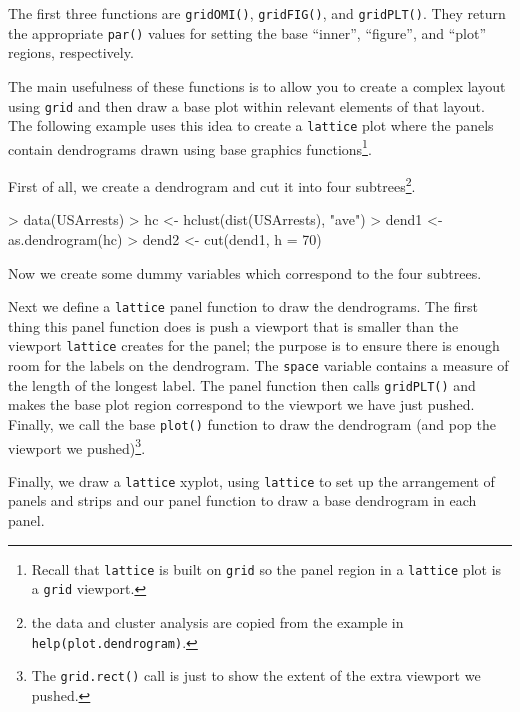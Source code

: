 \documentclass[a4paper]{article}
\newcommand{\grid}{{\tt grid}}
\newcommand{\lattice}{{\tt lattice}}
\begin{document}
The first three functions are \verb|gridOMI()|, \verb|gridFIG()|,
and \verb|gridPLT()|.  They return the appropriate
\verb|par()| values for setting the base ``inner'', ``figure'',
and ``plot'' regions, respectively.

The main usefulness of these functions is to allow you to create a
complex layout using \grid{} and then draw a base plot within 
relevant elements of that layout.  The following example
uses this idea to create a \lattice{} plot where the panels contain 
dendrograms drawn using base graphics functions\footnote{Recall
that \lattice{} is built on \grid{} so the panel region in
a \lattice{} plot is a \grid{} viewport.}.

First of all, we create a dendrogram and cut it into four 
subtrees\footnote{the data and cluster analysis are copied from the example
in {\tt help(plot.dendrogram)}.}.

\begin{Schunk}
\begin{Sinput}
> data(USArrests)
> hc <- hclust(dist(USArrests), "ave")
> dend1 <- as.dendrogram(hc)
> dend2 <- cut(dend1, h = 70)
\end{Sinput}
\end{Schunk}
Now we create some dummy variables which correspond to the four subtrees.

\begin{Schunk}
\end{Schunk}
Next we define a \lattice{} panel function to draw the dendrograms.
The first thing this panel function does is push a viewport
that is smaller than the viewport \lattice{} creates for the panel;
the purpose is to ensure there is enough room for the labels on
the dendrogram.  The \verb|space| variable contains a measure
of the length of the longest label.
The panel function then calls \verb|gridPLT()|
and makes the base plot region correspond to the 
viewport we have just pushed.  Finally, we
call the base \verb|plot()| function to draw the 
dendrogram (and pop the viewport we pushed)\footnote{The {\tt grid.rect()}
call is just to show the extent of the extra viewport we pushed.}.

\begin{Schunk}
\end{Schunk}
Finally, we draw a \lattice{} xyplot, using \lattice{} to set up the
arrangement of panels and strips and our panel function to draw
a base dendrogram in each panel.
\end{document}
